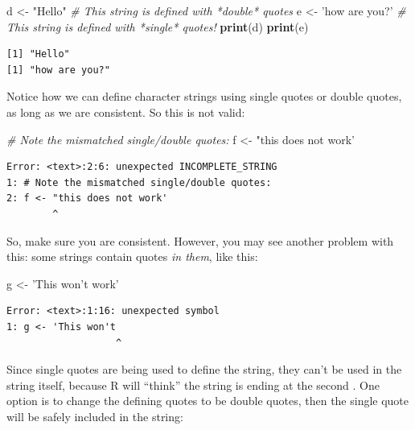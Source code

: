 \documentclass[
]{article}
\newenvironment{Shaded}{\begin{snugshade}}{\end{snugshade}}
\newcommand{\CommentTok}[1]{\textcolor[rgb]{0.56,0.35,0.01}{\textit{#1}}}
\newcommand{\KeywordTok}[1]{\textcolor[rgb]{0.13,0.29,0.53}{\textbf{#1}}}
\newcommand{\NormalTok}[1]{#1}
\newcommand{\StringTok}[1]{\textcolor[rgb]{0.31,0.60,0.02}{#1}}
\begin{document}
\begin{Shaded}
\begin{Highlighting}[]
\NormalTok{d <-}\StringTok{ "Hello"}         \CommentTok{# This string is defined with   *double*   quotes }
\NormalTok{e <-}\StringTok{ 'how are you?'}  \CommentTok{# This string is defined with   *single*   quotes!}
\KeywordTok{print}\NormalTok{(d)}
\KeywordTok{print}\NormalTok{(e)}
\end{Highlighting}
\end{Shaded}

\begin{verbatim}
[1] "Hello"
[1] "how are you?"
\end{verbatim}

Notice how we can define character strings using single quotes or double quotes, as long as we are consistent.
So this is not valid:

\begin{Shaded}
\begin{Highlighting}[]
\CommentTok{# Note the mismatched single/double quotes:}
\NormalTok{f <-}\StringTok{ "this does not work' }
\end{Highlighting}
\end{Shaded}

\begin{verbatim}
Error: <text>:2:6: unexpected INCOMPLETE_STRING
1: # Note the mismatched single/double quotes:
2: f <- "this does not work' 
        ^
\end{verbatim}

So, make sure you are consistent.
However, you may see another problem with this: some strings contain quotes \emph{in them}, like this:

\begin{Shaded}
\begin{Highlighting}[]
\NormalTok{g <-}\StringTok{ 'This won'}\NormalTok{t work}\StringTok{'}
\end{Highlighting}
\end{Shaded}

\begin{verbatim}
Error: <text>:1:16: unexpected symbol
1: g <- 'This won't
                   ^
\end{verbatim}

Since single quotes are being used to define the string, they can't be used in the string itself, because R will ``think'' the string is ending at the second \texttt{\textquotesingle{}}.
One option is to change the defining quotes to be double quotes, then the single quote will be safely included in the string:
\end{document}
